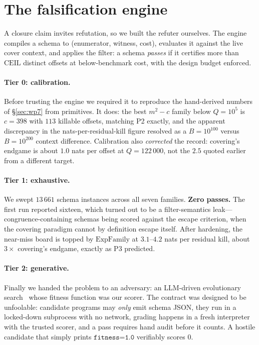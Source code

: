 \section{The falsification engine}\label{sec:engine-falsify}

A closure claim invites refutation, so we built the refuter ourselves. The
engine compiles a schema to (enumerator, witness, cost), evaluates it against
the live cover context, and applies the filter: a schema \emph{passes} if it
certifies more than $\mathrm{CEIL}$ distinct offsets at below-benchmark cost,
with the design budget enforced.

\paragraph{Tier 0: calibration.} Before trusting the engine we required it to
reproduce the hand-derived numbers of \S\ref{sec:wp7} from primitives. It does:
the best $m^{2}-c$ family below $Q=10^{5}$ is $c=398$ with $113$ killable
offsets, matching P2 exactly, and the apparent discrepancy in the
nats-per-residual-kill figure resolved as a $B=10^{100}$ versus $B=10^{200}$
context difference. Calibration also \emph{corrected} the record: covering's
endgame is about $1.0$ nats per offset at $Q=122\,000$, not the $2.5$ quoted
earlier from a different target.

\paragraph{Tier 1: exhaustive.} We swept $13\,661$ schema instances across all
seven families. \textbf{Zero passes.} The first run reported sixteen, which
turned out to be a filter-semantics leak---congruence-containing schemas being
scored against the escape criterion, when the covering paradigm cannot by
definition escape itself. After hardening, the near-miss board is topped by
$\mathrm{ExpFamily}$ at $3.1$--$4.2$ nats per residual kill, about $3\times$
covering's endgame, exactly as P3 predicted.

\paragraph{Tier 2: generative.} Finally we handed the problem to an adversary:
an LLM-driven evolutionary search~\cite{AlphaEvolve} whose fitness function was
our scorer. The contract was designed to be unfoolable: candidate programs may
\emph{only} emit schema JSON, they run in a locked-down subprocess with no
network, grading happens in a fresh interpreter with the trusted scorer, and a
pass requires hand audit before it counts. A hostile candidate that simply
prints $\texttt{fitness=1.0}$ verifiably scores $0$.

